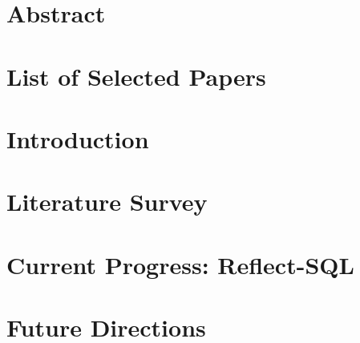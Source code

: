 \documentclass[11pt]{book}
\renewcommand{\baselinestretch}{1.2}
\begin{document}


\newpage
\thispagestyle{empty}
\renewcommand{\thesisdedication}{{\large Copyright \copyright~Anupreksha Jain, 2026\\}{\large All Rights Reserved\\}}
\thesisdedicationpage

\phdthesis
%
\chapter*{Abstract}
\label{ch:abstract}

%
\tableofcontents
\listoffigures
\let\cleardoublepage\clearpage
\listoftables
\printglossary[type=\acronymtype,title=Abbreviations,nonumberlist]

\chapter*{List of Selected Papers}
\label{ch:relatedPubs}


\chapter{Introduction}
\label{ch:intro}


\chapter{Literature Survey}
\label{ch:ch1}



\chapter{Current Progress: Reflect-SQL}
\label{ch:ch3}



\chapter{Future Directions}
\label{ch:future}

\end{document}
